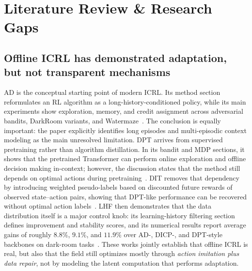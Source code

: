 \documentclass[10pt,twocolumn,letterpaper]{article}
\begin{document}
\section{Literature Review \& Research Gaps}
\subsection{Offline ICRL has demonstrated adaptation, but not transparent mechanisms}
AD is the conceptual starting point of modern ICRL. Its method section reformulates an RL algorithm as a long-history-conditioned policy, while its main experiments show exploration, memory, and credit assignment across adversarial bandits, DarkRoom variants, and Watermaze~\cite{laskin2022ad}. The conclusion is equally important: the paper explicitly identifies long episodes and multi-episodic context modeling as the main unresolved limitation. DPT arrives from supervised pretraining rather than algorithm distillation. In its bandit and MDP sections, it shows that the pretrained Transformer can perform online exploration and offline decision making in-context; however, the discussion states that the method still depends on optimal actions during pretraining~\cite{lee2023dpt}. DIT removes that dependency by introducing weighted pseudo-labels based on discounted future rewards of observed state--action pairs, showing that DPT-like performance can be recovered without optimal action labels~\cite{dong2024dit}. LHF then demonstrates that the data distribution itself is a major control knob: its learning-history filtering section defines improvement and stability scores, and its numerical results report average gains of roughly \(8.8\%\), \(9.1\%\), and \(11.9\%\) over AD-, DICP-, and DPT-style backbones on dark-room tasks~\cite{chen2025lhf}. These works jointly establish that offline ICRL is real, but also that the field still optimizes mostly through \emph{action imitation plus data repair}, not by modeling the latent computation that performs adaptation.
\end{document}
